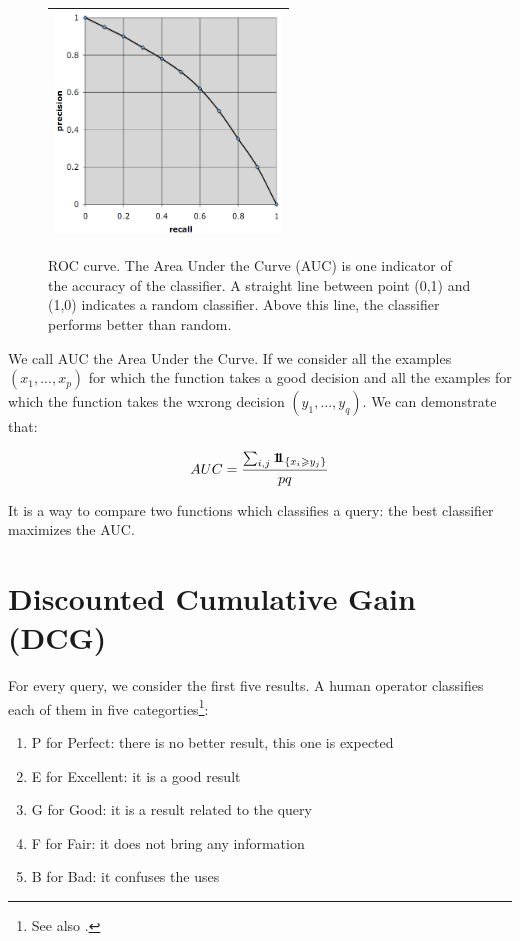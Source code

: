 \begin{figure}[ht]
\begin{center}\begin{tabular}{|c|} \hline
\includegraphics[width=6cm]{image/oneroc.png} \\ \hline
\end{tabular}\end{center}
\caption{ROC curve. The Area Under the Curve (AUC) is one indicator of the accuracy of the classifier. A straight line between point (0,1) and (1,0) indicates a random classifier. Above this line, the classifier performs better than random. }
\label{figure_roc}
\end{figure}



We call AUC the Area Under the Curve. If we consider all the examples $(x_1,...,x_p)$ for which the function takes a good decision and all the examples for which the function takes the wxrong decision $(y_1,...,y_q)$. We can demonstrate that:

\begin{eqnarray}
AUC = \frac{ \sum_{i,j} \mathbf{1\!\!1}_{\left\{x_i \geqslant y_j\right\}} }{ pq }
\end{eqnarray}

It is a way to compare two functions which classifies a query: the best classifier maximizes the AUC.

\section{Discounted Cumulative Gain (DCG)}

For every query, we consider the first five results. A human operator classifies each of them in five categorties\footnote{See also .}:

\begin{enumerate}
\item P for Perfect: there is no better result, this one is expected
\item E for Excellent: it is a good result
\item G for Good: it is a result related to the query
\item F for Fair: it does not bring any information
\item B for Bad: it confuses the uses
\end{enumerate}

